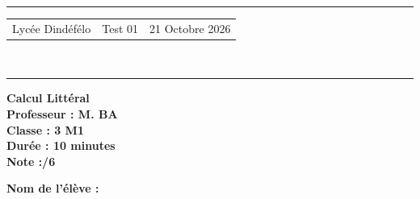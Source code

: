 \documentclass[a4paper,12pt]{article}
\begin{document}
\hrule %
\begin{center}
    \begin{tabular}{@{} p{5cm} p{5cm} p{5cm} @{}} %
        Lycée Dindéfélo & \quad\quad\quad Test 01 & 21 Octobre 2026 \\
    \end{tabular}
    \\[-0.01cm] %
    \hrule %
\end{center}
\begin{center}
    \textbf{\Large Calcul Littéral } \\[0.2cm]
    \textbf{\large Professeur : M. BA} \\[0.2cm]
    \textbf{Classe : 3 M1} \\[0.2cm]
    \textbf{\small Durée : 10 minutes} \\[0.2cm]
    \textbf{\small Note :\quad\quad /6}
\end{center}

\textbf{\small Nom de l'élève :} \underline{\hspace{8cm}} \\[0.5cm]
\end{document}
